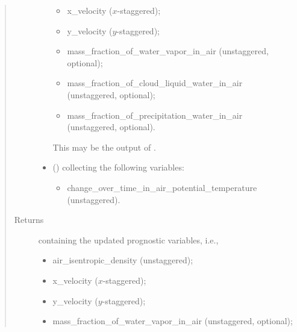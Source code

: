 \documentclass[letterpaper,10pt,english]{sphinxmanual}
\begin{document}
\begin{fulllineitems}
\begin{fulllineitems}
\begin{quote}
\begin{description}
\begin{itemize}
\begin{itemize}
\item {} 
x\_velocity (\(x\)-staggered);

\item {} 
y\_velocity (\(y\)-staggered);

\item {} 
mass\_fraction\_of\_water\_vapor\_in\_air (unstaggered, optional);

\item {} 
mass\_fraction\_of\_cloud\_liquid\_water\_in\_air (unstaggered, optional);

\item {} 
mass\_fraction\_of\_precipitation\_water\_in\_air (unstaggered, optional).

\end{itemize}

This may be the output of
{\hyperref[\detokenize{api:tasmania.dycore.prognostic_isentropic_nonconservative.PrognosticIsentropicNonconservative.step_neglecting_vertical_advection}]{}}.


\item {} 
 () \textendash{} 
{\hyperref[\detokenize{api:tasmania.storages.grid_data.GridData}]{}} collecting the following variables:
\begin{itemize}
\item {} 
change\_over\_time\_in\_air\_potential\_temperature (unstaggered).

\end{itemize}


\end{itemize}

\item[{Returns}] \leavevmode

{\hyperref[\detokenize{api:tasmania.storages.state_isentropic.StateIsentropic}]{}} containing the updated prognostic variables, i.e.,
\begin{itemize}
\item {} 
air\_isentropic\_density (unstaggered);

\item {} 
x\_velocity (\(x\)-staggered);

\item {} 
y\_velocity (\(y\)-staggered);

\item {} 
mass\_fraction\_of\_water\_vapor\_in\_air (unstaggered, optional);


\end{itemize}
\end{description}
\end{quote}
\end{fulllineitems}
\end{fulllineitems}
\end{document}
